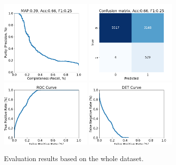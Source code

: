 \documentclass[DM,authoryear,toc]{lsstdoc}
\begin{document}
\begin{figure}[h]
  \centering
  \includegraphics[width=0.4\textwidth]{precrec_13-resnet50-FullAugmentation-scratch-B64__0255000__npy_data_0.1.2-0sigma_256by256__posw_1.png}
  \includegraphics[width=0.4\textwidth]{confmat_13-resnet50-FullAugmentation-scratch-B64__0255000__npy_data_0.1.2-0sigma_256by256__posw_1.png}
  \includegraphics[width=0.4\textwidth]{roc_13-resnet50-FullAugmentation-scratch-B64__0255000__npy_data_0.1.2-0sigma_256by256__posw_1.png}
  \includegraphics[width=0.4\textwidth]{det_13-resnet50-FullAugmentation-scratch-B64__0255000__npy_data_0.1.2-0sigma_256by256__posw_1.png}
  \caption{Evaluation results based on the whole dataset.}
  \label{fig:tract_templates}
\end{figure}
\end{document}
